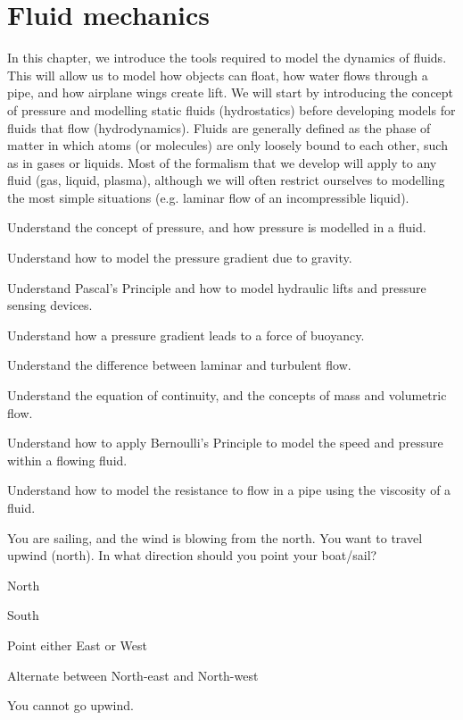 
\chapter{Fluid mechanics}
\label{chapter:fluidmechanics}
In this chapter, we introduce the tools required to model the dynamics of fluids. This will allow us to model how objects can float, how water flows through a pipe, and how airplane wings create lift. We will start by introducing the concept of pressure and modelling static fluids (hydrostatics) before developing models for fluids that flow (hydrodynamics). Fluids are generally defined as the phase of matter in which atoms (or molecules) are only loosely bound to each other, such as in gases or liquids.  Most of the formalism that we develop will apply to any fluid (gas, liquid, plasma), although we will often restrict ourselves to modelling the most simple situations (e.g. laminar flow of an incompressible liquid).

\begin{learningObjectives}{
 \item Understand the concept of pressure, and how pressure is modelled in a fluid.
 \item Understand how to model the pressure gradient due to gravity.
 \item Understand Pascal's Principle and how to model hydraulic lifts and pressure sensing devices.
 \item Understand how a pressure gradient leads to a force of buoyancy.
 \item Understand the difference between laminar and turbulent flow.
 \item Understand the equation of continuity, and the concepts of mass and volumetric flow.
 \item Understand how to apply Bernoulli's Principle to model the speed and pressure within a flowing fluid.
 \item Understand how to model the resistance to flow in a pipe using the viscosity of a fluid.
 }
\end{learningObjectives}

\begin{opening}
\begin{MCquestion}{You are sailing, and the wind is blowing from the north. You want to travel upwind (north). In what direction should you point your boat/sail?
}
\item North
\item South
\item Point either East or West
\item Alternate between North-east and North-west \correct
\item You cannot go upwind.
\end{MCquestion}
\end{opening}

